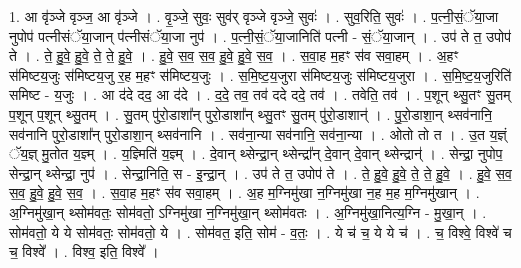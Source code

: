 \documentclass[17pt]{extarticle}
\begin{document}
1. आ वृ॑ञ्जे वृञ्ज॒ आ वृ॑ञ्जे । . वृ॒ञ्जे॒ सुवः॒ सुव॑र् वृञ्जे वृञ्जे॒ सुवः॑ । . सुव॒रिति॒ सुवः॑ । . प॒त्नी॒सं॒ॅया॒जा नुपोप॑ पत्नीसंॅया॒जान् प॑त्नीसंॅया॒जा नुप॑ । . प॒त्नी॒सं॒ॅया॒जानिति॑ पत्नी - सं॒ॅया॒जान् । . उप॑ ते त॒ उपोप॑ ते । . ते॒ हु॒वे॒ हु॒वे॒ ते॒ ते॒ हु॒वे॒ । . हु॒वे॒ स॒व॒ स॒व॒ हु॒वे॒ हु॒वे॒ स॒व॒ । . स॒वा॒ह म॒हꣳ स॑व सवा॒हम् । . अ॒हꣳ स॑मिष्टय॒जुः स॑मिष्टय॒जु र॒ह म॒हꣳ स॑मिष्टय॒जुः । . स॒मि॒ष्ट॒य॒जुरा स॑मिष्टय॒जुः स॑मिष्टय॒जुरा । . स॒मि॒ष्ट॒य॒जुरिति॑ समिष्ट - य॒जुः । . आ द॑दे दद॒ आ द॑दे । . द॒दे॒ तव॒ तव॑ ददे ददे॒ तव॑ । . तवेति॒ तव॑ । . प॒शून् थ्सु॒तꣳ सु॒तम् प॒शून् प॒शून् थ्सु॒तम् । . सु॒तम् पु॑रो॒डाशा᳚न् पुरो॒डाशा᳚न् थ्सु॒तꣳ सु॒तम् पु॑रो॒डाशान्॑ । . पु॒रो॒डाशा॒न् थ्सव॑नानि॒ सव॑नानि पुरो॒डाशा᳚न् पुरो॒डाशा॒न् थ्सव॑नानि । . सव॑ना॒न्या सव॑नानि॒ सव॑ना॒न्या । . ओतो तो त । . उ॒त य॒ज्ञ्ं ॅय॒ज्ञ् मु॒तोत य॒ज्ञ्म् । . य॒ज्ञ्मिति॑ य॒ज्ञ्म् । . दे॒वान् थ्सेन्द्रा॒न् थ्सेन्द्रा᳚न् दे॒वान् दे॒वान् थ्सेन्द्रान्॑ । . सेन्द्रा॒ नुपोप॒ सेन्द्रा॒न् थ्सेन्द्रा॒ नुप॑ । . सेन्द्रा॒निति॒ स - इ॒न्द्रा॒न् । . उप॑ ते त॒ उपोप॑ ते । . ते॒ हु॒वे॒ हु॒वे॒ ते॒ ते॒ हु॒वे॒ । . हु॒वे॒ स॒व॒ स॒व॒ हु॒वे॒ हु॒वे॒ स॒व॒ । . स॒वा॒ह म॒हꣳ स॑व सवा॒हम् । . अ॒ह म॒ग्निमु॑खा न॒ग्निमु॑खा न॒ह म॒ह म॒ग्निमु॑खान् । . अ॒ग्निमु॑खा॒न् थ्सोम॑वतः॒ सोम॑वतो॒ ऽग्निमु॑खा न॒ग्निमु॑खा॒न् थ्सोम॑वतः । . अ॒ग्निमु॑खा॒नित्य॒ग्नि - मु॒खा॒न् । . सोम॑वतो॒ ये ये सोम॑वतः॒ सोम॑वतो॒ ये । . सोम॑वत॒ इति॒ सोम॑ - व॒तः॒ । . ये च॑ च॒ ये ये च॑ । . च॒ विश्वे॒ विश्वे॑ च च॒ विश्वे᳚ । . विश्व॒ इति॒ विश्वे᳚ । \newline
\end{document}
